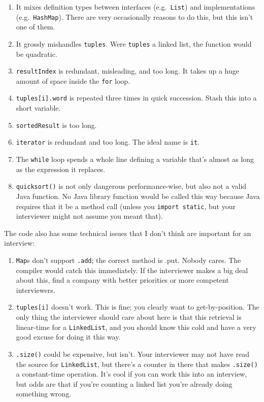 \documentclass{article}
\begin{document}
\begin{enumerate}
\item{It mixes definition types between interfaces (e.g.~{\tt List})}
  and implementations (e.g.~{\tt HashMap}). There are very occasionally
  reasons to do this, but this isn't one of them.
\item{It grossly mishandles {\tt tuples}. Were {\tt tuples} a linked}
  list, the function would be quadratic.
\item{{\tt resultIndex} is redundant, misleading, and too long. It}
  takes up a huge amount of space inside the {\tt for} loop.
\item{{\tt tuples[i].word} is repeated three times in quick}
  succession. Stash this into a short variable.
\item{{\tt sortedResult} is too long.}
\item{{\tt iterator} is redundant and too long. The ideal name is}
  {\tt it}.
\item{The {\tt while} loop spends a whole line defining a variable}
  that's almost as long as the expression it replaces.
\item{{\tt quicksort()} is not only dangerous performance-wise, but}
  also not a valid Java function. No Java library function would be
  called this way because Java requires that it be a method call
  (unless you {\tt import static}, but your interviewer might not
  assume you meant that).
\end{enumerate}

      The code also has some technical issues that I don't think are important
      for an interview:

\begin{enumerate}
\item{{\tt Map}s don't support {\tt .add}; the correct method is {\tt}
  .put}. Nobody cares. The compiler would catch this immediately. If
  the interviewer makes a big deal about this, find a company with
  better priorities or more competent interviewers.

\item{{\tt tuples[i]} doesn't work. This is fine; you clearly want to}
  get-by-position. The only thing the interviewer should care about
  here is that this retrieval is linear-time for a {\tt LinkedList},
  and you should know this cold and have a very good excuse for doing
  it this way.

\item{{\tt .size()} could be expensive, but isn't. Your interviewer}
  may not have read the source for {\tt LinkedList}, but there's a
  counter in there that makes {\tt .size()} a constant-time operation.
  It's cool if you can work this into an interview, but odds are that
  if you're counting a linked list you're already doing something
  wrong.
\end{enumerate}
\end{document}
